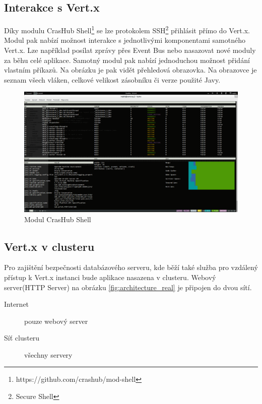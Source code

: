 \subsection{Interakce s Vert.x}\label{sub:interaction}

Díky modulu CrasHub Shell\footnote{https://github.com/crashub/mod-shell} se lze protokolem SSH\footnote{Secure Shell} přihlásit přímo do Vert.x. Modul pak nabízí možnost interakce s jednotlivými komponentami samotného Vert.x. Lze například posílat zprávy přes Event Bus nebo nasazovat nové moduly za běhu celé aplikace. Samotný modul pak nabízí jednoduchou možnost přidání vlastním příkazů. Na obrázku je pak vidět přehledová obrazovka. Na obrazovce je seznam všech vláken, celkové velikost zásobníku či verze použité Javy. 

\begin{figure}
\begin{centering}
\includegraphics[scale=0.21]{obrazky/real_interaction}
\par\end{centering}
\caption{Modul CrasHub Shell\label{fig:real_interaction}}
\end{figure}

\subsection{Vert.x v clusteru}\label{sub:praktCluster}

Pro zajištění bezpečnosti databázového serveru, kde běží také služba pro vzdálený přístup k Vert.x instanci bude aplikace nasazena v clusteru. Webový server(HTTP Server) na obrázku \ref{fig:architecture_real} je připojen do dvou sítí.

\begin{description}
\item[Internet] pouze webový server
\item[Síť clusteru] všechny servery
\end{description}

